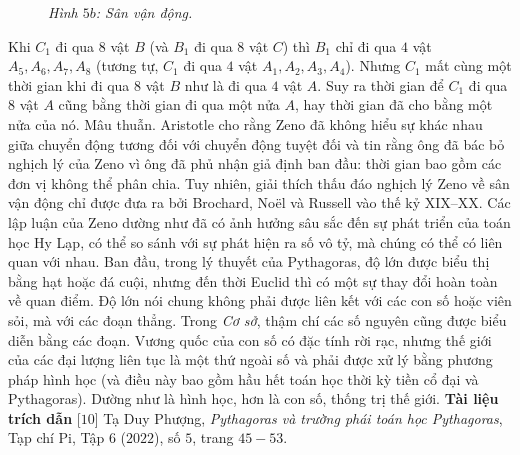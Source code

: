 \begin{multicols}{2}
\begin{figure}[H]
	\caption{\small\textit{\color{lichsutoanhoc}Hình $5b$: Sân vận động.}}
	\vspace*{-5pt}
	\end{figure}
	Khi $C_1$  đi qua $8$ vật $B$  (và $B_1$ đi qua 8 vật  $C$) thì $B_1$  chỉ đi qua $4$ vật $A_5, A_6, A_7, A_8$  (tương tự,  $C_1$  đi qua $4$ vật  $A_1, A_2, A_3, A_4$). Nhưng $C_1$  mất cùng một thời gian khi đi qua $8$ vật  $B$ như là đi qua $4$ vật $A$.  Suy ra thời gian để  $C_1$  đi qua $8$ vật $A$  cũng bằng thời gian đi qua một nửa $A$,  hay thời gian đã cho bằng một nửa của nó. Mâu thuẫn.     
	\vskip 0.1cm
	Aristotle cho rằng Zeno đã không hiểu sự khác nhau giữa chuyển động tương đối với chuyển động tuyệt đối và tin rằng ông đã bác bỏ nghịch lý của Zeno vì ông đã phủ nhận giả định ban đầu: thời gian bao gồm các đơn vị không thể phân chia. Tuy nhiên, giải thích thấu đáo nghịch lý Zeno về sân vận động chỉ được đưa ra bởi Brochard, Noël và Russell vào thế kỷ XIX--XX.
	\vskip 0.1cm 
	Các lập luận của Zeno dường như đã có ảnh hưởng sâu sắc đến sự phát triển của toán học Hy Lạp, có thể so sánh với sự phát hiện ra số vô tỷ, mà chúng có thể có liên quan với nhau. Ban đầu, trong lý thuyết của Pythagoras, độ lớn được biểu thị bằng hạt hoặc đá cuội, nhưng đến thời Euclid thì có một sự thay đổi hoàn toàn về quan điểm.  Độ lớn nói chung không phải được liên kết với các con số hoặc viên sỏi, mà với các đoạn thẳng. Trong \textit{Cơ sở}, thậm chí các số nguyên cũng được biểu diễn bằng các đoạn. Vương quốc của con số có đặc tính rời rạc, nhưng thế giới của các đại lượng liên tục là một thứ ngoài số và phải được xử lý bằng phương pháp hình học (và điều này bao gồm hầu hết toán học thời kỳ tiền cổ đại và Pythagoras).  Dường như là hình học, hơn là con số, thống trị thế giới.
	\vskip 0.1cm
	\textbf{\color{lichsutoanhoc}Tài liệu trích dẫn}
	\vskip 0.1cm
	[$10$] Tạ Duy Phượng, \textit{Pythagoras và trường phái toán học Pythagoras}, Tạp chí Pi, Tập $6$ ($2022$), số $5$, trang $45-53$.
\end{multicols}
